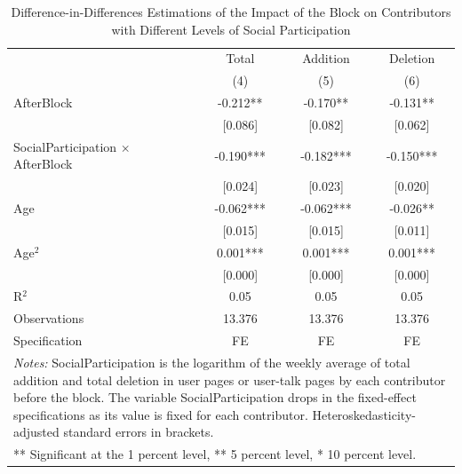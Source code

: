 \begin{table}[htbp]
\centering
\small
\def\sym#1{\ifmmode^{#1}\else\(^{#1}\)\fi}
\caption{Difference-in-Differences Estimations of the Impact of the Block on
Contributors with Different Levels of Social Participation}
\label{tab:table3}
\begin{tabular}{l*{3}{c}}
\toprule
& \multicolumn{1}{c}{Total}
& \multicolumn{1}{c}{Addition}
& \multicolumn{1}{c}{Deletion} \\
& (4) & (5) & (6) \\
\midrule
AfterBlock  &      -0.212** &      -0.170** &      -0.131** \\
            &     [0.086]   &     [0.082]   &     [0.062]   \\
SocialParticipation $\times$ AfterBlock&      -0.190***&      -0.182***&      -0.150***\\
            &     [0.024]   &     [0.023]   &     [0.020]   \\
Age         &      -0.062***&      -0.062***&      -0.026** \\
            &     [0.015]   &     [0.015]   &     [0.011]   \\
Age$^2$     &       0.001***&       0.001***&       0.001***\\
            &     [0.000]   &     [0.000]   &     [0.000]   \\
\midrule
R$^2$       &        0.05   &        0.05   &        0.05   \\
Observations&      13.376   &      13.376   &      13.376   \\
Specification & FE & FE & FE \\
\bottomrule
\multicolumn{4}{p{0.92\linewidth}}{\footnotesize \textit{Notes:}
 SocialParticipation is the logarithm of the weekly average of total
 addition and total deletion in user pages or user-talk pages by each
 contributor before the block. The variable SocialParticipation drops
 in the fixed-effect specifications as its value is fixed for each
 contributor. Heteroskedasticity-adjusted standard errors in brackets.} \\
\multicolumn{4}{l}{\footnotesize *** Significant at the 1 percent level,
 ** 5 percent level, * 10 percent level.} \\
\end{tabular}
\end{table}
